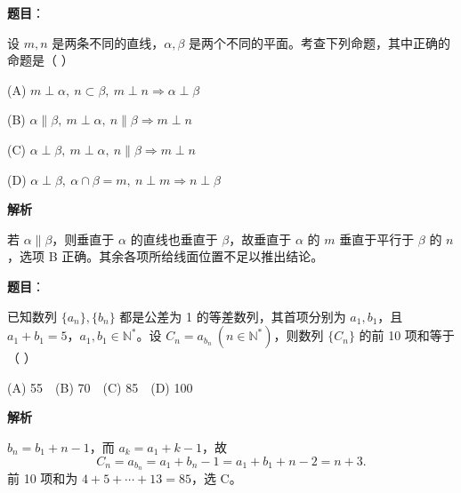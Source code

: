 \begin{answer}

\textbf{题目}：

设 \(m,n\) 是两条不同的直线，\(\alpha,\beta\) 是两个不同的平面。考查下列命题，其中正确的命题是（  ）

(A) \(m\perp\alpha,\ n\subset\beta,\ m\perp n\Rightarrow\alpha\perp\beta\)

(B) \(\alpha\parallel\beta,\ m\perp\alpha,\ n\parallel\beta\Rightarrow m\perp n\)

(C) \(\alpha\perp\beta,\ m\perp\alpha,\ n\parallel\beta\Rightarrow m\perp n\)

(D) \(\alpha\perp\beta,\ \alpha\cap\beta=m,\ n\perp m\Rightarrow n\perp\beta\)

\textbf{解析}

若 \(\alpha\parallel\beta\)，则垂直于 \(\alpha\) 的直线也垂直于 \(\beta\)，故垂直于 \(\alpha\) 的 \(m\) 垂直于平行于 \(\beta\) 的 \(n\)，选项 B 正确。其余各项所给线面位置不足以推出结论。


\end{answer}
\begin{answer}

\textbf{题目}：

已知数列 \(\{a_n\},\{b_n\}\) 都是公差为 1 的等差数列，其首项分别为 \(a_1,b_1\)，且 \(a_1+b_1=5\)，\(a_1,b_1\in\mathbb N^*\)。设 \(C_n=a_{b_n}\ (n\in\mathbb N^*)\)，则数列 \(\{C_n\}\) 的前 10 项和等于（  ）

(A) 55　(B) 70　(C) 85　(D) 100

\textbf{解析}

\(b_n=b_1+n-1\)，而 \(a_k=a_1+k-1\)，故
\nopagebreak[4]
\[
C_n=a_{b_n}=a_1+b_n-1=a_1+b_1+n-2=n+3.
\]
前 10 项和为 \(4+5+\cdots+13=85\)，选 C。


\end{answer}
